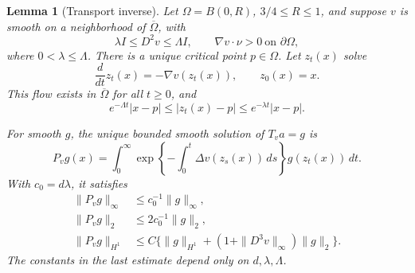\documentclass[11pt]{article}
\newtheorem{lemma}[theorem]{Lemma}
\theoremstyle{remark}
\begin{document}
\begin{lemma}[Transport inverse]\label{lem:transport}
Let \(\Omega=B(0,R)\), \(3/4\leq R\leq1\), and suppose \(v\) is
smooth on a neighborhood of \(\overline\Omega\), with
\begin{equation}\label{eq:geometry}
\lambda I\leq D^2v\leq\Lambda I,\qquad
\nabla v\cdot\nu>0\ \text{on }\partial\Omega,
\end{equation}
where \(0<\lambda\leq\Lambda\).
There is a unique critical point \(p\in\Omega\).
Let \(z_t(x)\) solve
\[
\frac{d}{dt}z_t(x)=-\nabla v(z_t(x)),\qquad z_0(x)=x.
\]
This flow exists in \(\overline\Omega\) for all \(t\geq0\), and
\begin{equation}\label{eq:radial-flow}
e^{-\Lambda t}|x-p|
\leq |z_t(x)-p|
\leq e^{-\lambda t}|x-p|.
\end{equation}

For smooth \(g\), the unique bounded smooth solution of \(T_v a=g\)
is
\begin{equation}\label{eq:transport-inverse}
P_vg(x)=
\int_0^\infty
\exp\left\{-\int_0^t\Delta v(z_s(x))\,ds\right\}
g(z_t(x))\,dt.
\end{equation}
With \(c_0=d\lambda\), it satisfies
\begin{align}
\|P_vg\|_\infty&\leq c_0^{-1}\|g\|_\infty,\label{eq:P-infty}\\
\|P_vg\|_2&\leq 2c_0^{-1}\|g\|_2,\label{eq:P-L2}\\
\|P_vg\|_{H^1}
&\leq C\big\{\|g\|_{H^1}
 +(1+\|D^3v\|_\infty)\|g\|_2\big\}.
\label{eq:P-H1}
\end{align}
The constants in the last estimate depend only on \(d,\lambda,\Lambda\).
\end{lemma}
\end{document}

